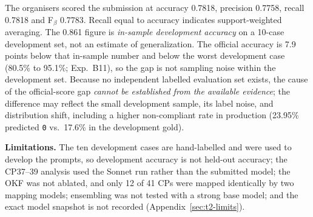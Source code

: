 The organisers scored the submission at accuracy 0.7818, precision 0.7758, recall
0.7818 and F$_\beta$ 0.7783. Recall equal to accuracy indicates support-weighted
averaging. The 0.861 figure is \emph{in-sample development accuracy} on a 10-case
development set, not an estimate of generalization. The official accuracy is 7.9
points below that in-sample number and below the worst development case (80.5\% to
95.1\%; Exp.~B11), so the gap is not sampling noise within the development set.
Because no independent labelled evaluation set exists, the cause of the
official-score gap \emph{cannot be established from the available evidence}; the
difference may reflect the small development sample, its label noise, and
distribution shift, including a higher non-compliant rate in production (23.95\%
predicted \texttt{0} vs.\ 17.6\% in the development gold).

\noindent\textbf{Limitations.} The ten development cases are hand-labelled and were
used to develop the prompts, so development accuracy is not held-out accuracy; the
CP37--39 analysis used the Sonnet run rather than the submitted model; the OKF was not
ablated, and only 12 of 41 CPs were mapped identically by two mapping models;
ensembling was not tested with a strong base model; and the exact model snapshot is
not recorded (Appendix~\ref{sec:t2-limits}).
